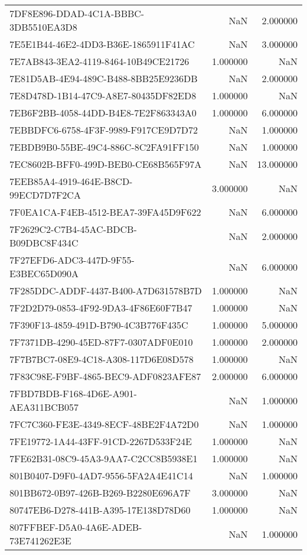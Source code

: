 \begin{tabular}{lrr}
7DF8E896-DDAD-4C1A-BBBC-3DB5510EA3D8 & NaN & 2.000000 \\
7E5E1B44-46E2-4DD3-B36E-1865911F41AC & NaN & 3.000000 \\
7E7AB843-3EA2-4119-8464-10B49CE21726 & 1.000000 & NaN \\
7E81D5AB-4E94-489C-B488-8BB25E9236DB & NaN & 2.000000 \\
7E8D478D-1B14-47C9-A8E7-80435DF82ED8 & 1.000000 & NaN \\
7EB6F2BB-4058-44DD-B4E8-7E2F863343A0 & 1.000000 & 6.000000 \\
7EBBDFC6-6758-4F3F-9989-F917CE9D7D72 & NaN & 1.000000 \\
7EBDB9B0-55BE-49C4-886C-8C2FA91FF150 & NaN & 1.000000 \\
7EC8602B-BFF0-499D-BEB0-CE68B565F97A & NaN & 13.000000 \\
7EEB85A4-4919-464E-B8CD-99ECD7D7F2CA & 3.000000 & NaN \\
7F0EA1CA-F4EB-4512-BEA7-39FA45D9F622 & NaN & 6.000000 \\
7F2629C2-C7B4-45AC-BDCB-B09DBC8F434C & NaN & 2.000000 \\
7F27EFD6-ADC3-447D-9F55-E3BEC65D090A & NaN & 6.000000 \\
7F285DDC-ADDF-4437-B400-A7D631578B7D & 1.000000 & NaN \\
7F2D2D79-0853-4F92-9DA3-4F86E60F7B47 & 1.000000 & NaN \\
7F390F13-4859-491D-B790-4C3B776F435C & 1.000000 & 5.000000 \\
7F7371DB-4290-45ED-87F7-0307ADF0E010 & 1.000000 & 2.000000 \\
7F7B7BC7-08E9-4C18-A308-117D6E08D578 & 1.000000 & NaN \\
7F83C98E-F9BF-4865-BEC9-ADF0823AFE87 & 2.000000 & 6.000000 \\
7FBD7BDB-F168-4D6E-A901-AEA311BCB057 & NaN & 1.000000 \\
7FC7C360-FE3E-4349-8ECF-48BE2F4A72D0 & NaN & 1.000000 \\
7FE19772-1A44-43FF-91CD-2267D533F24E & 1.000000 & NaN \\
7FE62B31-08C9-45A3-9AA7-C2CC8B5938E1 & 1.000000 & NaN \\
801B0407-D9F0-4AD7-9556-5FA2A4E41C14 & NaN & 1.000000 \\
801BB672-0B97-426B-B269-B2280E696A7F & 3.000000 & NaN \\
80747EB6-D278-441B-A395-17E138D78D60 & 1.000000 & NaN \\
807FFBEF-D5A0-4A6E-ADEB-73E741262E3E & NaN & 1.000000 \\

\end{tabular}
